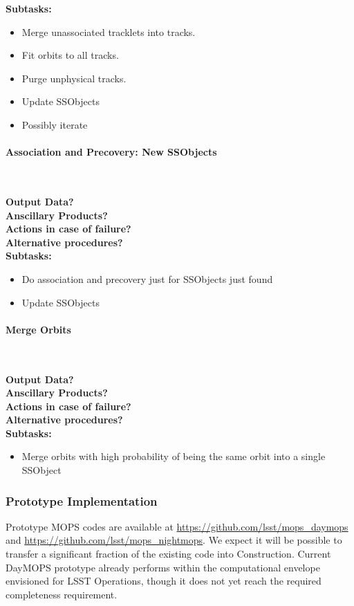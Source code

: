 \noindent
{\bf Subtasks:}
\begin{itemize}
\item Merge unassociated tracklets into tracks.
\item Fit orbits to all tracks.
\item Purge unphysical tracks.
\item Update SSObjects
\item Possibly iterate
\end{itemize}

\paragraph{Association and Precovery: New SSObjects}~

\noindent
{\bf Output Data?}\\
{\bf Anscillary Products?}\\
{\bf Actions in case of failure?}\\
{\bf Alternative procedures?}\\

\noindent
{\bf Subtasks:}
\begin{itemize}
\item Do association and precovery just for SSObjects just found
\item Update SSObjects
\end{itemize}

\paragraph{Merge Orbits}~

\noindent
{\bf Output Data?}\\
{\bf Anscillary Products?}\\
{\bf Actions in case of failure?}\\
{\bf Alternative procedures?}\\

\noindent
{\bf Subtasks:}
\begin{itemize}
\item Merge orbits with high probability of being the same orbit into a single SSObject
\end{itemize}

\subsubsection{Prototype Implementation}

Prototype MOPS codes are available at \url{https://github.com/lsst/mops_daymops} and \url{https://github.com/lsst/mops_nightmops}. We expect it will be possible to transfer a significant fraction of the existing code into Construction. Current DayMOPS prototype already performs within the computational envelope envisioned for LSST Operations, though it does not yet reach the required completeness requirement.
